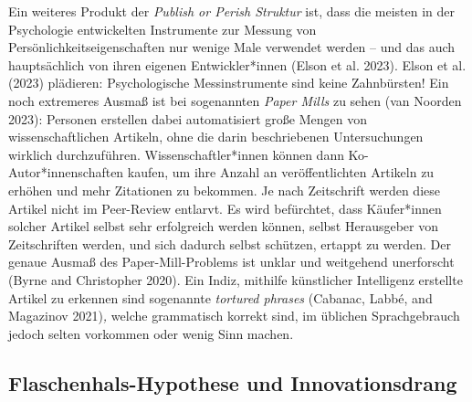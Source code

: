 \documentclass[
  letterpaper,
  DIV=11,
  numbers=noendperiod]{scrreprt}
\begin{document}
Ein weiteres Produkt der \emph{Publish or Perish Struktur} ist, dass die
meisten in der Psychologie entwickelten Instrumente zur Messung von
Persönlichkeitseigenschaften nur wenige Male verwendet werden -- und das
auch hauptsächlich von ihren eigenen Entwickler*innen (Elson et al.
2023). Elson et al. (2023) plädieren: Psychologische Messinstrumente
sind keine Zahnbürsten! Ein noch extremeres Ausmaß ist bei sogenannten
\emph{Paper Mills} zu sehen (van Noorden 2023): Personen erstellen dabei
automatisiert große Mengen von wissenschaftlichen Artikeln, ohne die
darin beschriebenen Untersuchungen wirklich durchzuführen.
Wissenschaftler*innen können dann Ko-Autor*innenschaften kaufen, um ihre
Anzahl an veröffentlichten Artikeln zu erhöhen und mehr Zitationen zu
bekommen. Je nach Zeitschrift werden diese Artikel nicht im Peer-Review
entlarvt. Es wird befürchtet, dass Käufer*innen solcher Artikel selbst
sehr erfolgreich werden können, selbst Herausgeber von Zeitschriften
werden, und sich dadurch selbst schützen, ertappt zu werden. Der genaue
Ausmaß des Paper-Mill-Problems ist unklar und weitgehend unerforscht
(Byrne and Christopher 2020). Ein Indiz, mithilfe künstlicher
Intelligenz erstellte Artikel zu erkennen sind sogenannte \emph{tortured
phrases} (Cabanac, Labbé, and Magazinov 2021)\emph{,} welche grammatisch
korrekt sind, im üblichen Sprachgebrauch jedoch selten vorkommen oder
wenig Sinn machen.

\subsection{Flaschenhals-Hypothese und
Innovationsdrang}\label{flaschenhals-hypothese-und-innovationsdrang}
\end{document}
